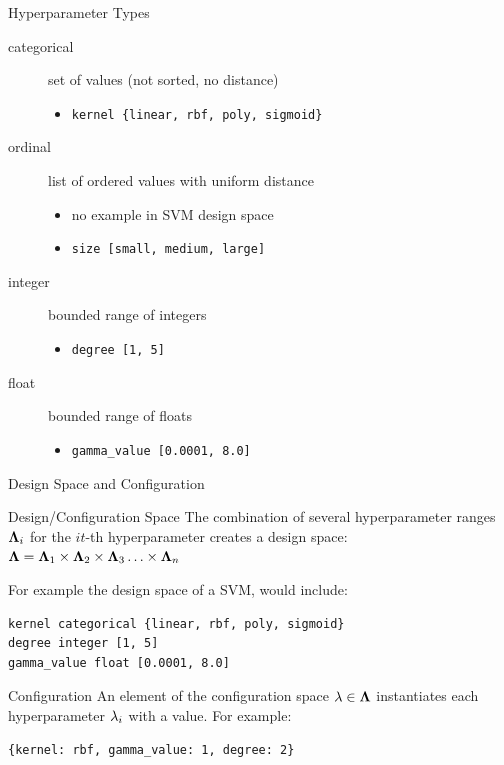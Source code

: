 \begin{frame}[c]{Hyperparameter Types}

\begin{description}
	\item[categorical] set of values (not sorted, no distance)
	\begin{itemize}
	  \item \texttt{kernel \{linear, rbf, poly, sigmoid\}}
	\end{itemize}
	\pause
	\item[ordinal] list of ordered values with uniform distance
	\begin{itemize}
	  \item no example in SVM design space
	  \item \texttt{size [small, medium, large]}
	\end{itemize}
	\pause
	\item[integer] bounded range of integers
	\begin{itemize}
	  \item \texttt{degree [1, 5]}
	\end{itemize}
	\pause
	\item[float] bounded range of floats
	\begin{itemize}
	  \item \texttt{gamma\_value [0.0001, 8.0]}
	\end{itemize}
\end{description}

\end{frame}
\begin{frame}[c,fragile]{Design Space and Configuration}

\begin{block}{Design/Configuration Space}
The combination of several hyperparameter ranges $\mathbf{\Lambda}_i$ for the $it$-th hyperparameter creates a design space:
$\mathbf{\Lambda} = \mathbf{\Lambda}_1 \times \mathbf{\Lambda}_2 \times \mathbf{\Lambda}_3 \ldots \times \mathbf{\Lambda}_n$ 

\pause
\bigskip

For example the design space of a SVM, would include:

\begin{verbatim}
kernel categorical {linear, rbf, poly, sigmoid}
degree integer [1, 5]
gamma_value float [0.0001, 8.0]
\end{verbatim}
\end{block}

\pause

\begin{block}{Configuration}
An element of the configuration space $\mathbf{\lambda} \in \mathbf{\Lambda}$ instantiates each hyperparameter $\mathbf{\lambda}_i$ with a value.
For example:
\begin{verbatim}
{kernel: rbf, gamma_value: 1, degree: 2}
\end{verbatim}

\end{block}

\end{frame}
